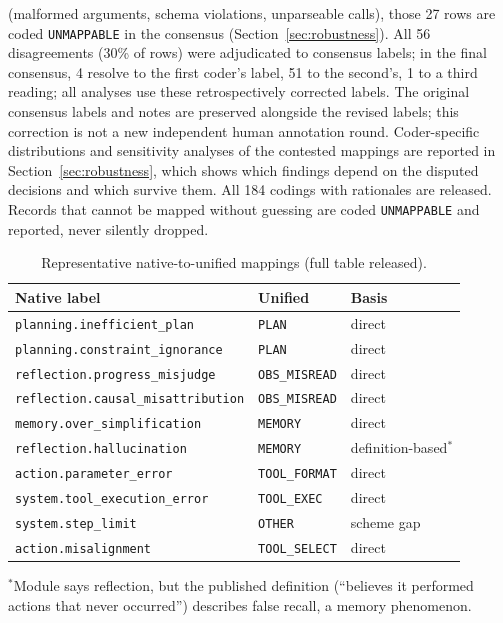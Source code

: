\documentclass[12pt,letterpaper]{article}
\begin{document}
(malformed arguments, schema violations, unparseable calls), those 27 rows
are coded \texttt{UNMAPPABLE} in the consensus (Section~\ref{sec:robustness}).
All 56 disagreements (30\% of rows) were adjudicated to consensus labels; in the final consensus, 4 resolve to the first
coder's label, 51 to the second's, 1 to a third reading; all analyses use these retrospectively corrected labels. The original
consensus labels and notes are preserved alongside the revised labels;
this correction is not a new independent human annotation round. Coder-specific distributions and sensitivity analyses of
the contested mappings are reported in Section~\ref{sec:robustness}, which shows which
findings depend on the disputed decisions and which survive them.
All 184 codings with rationales are
released. Records that cannot be mapped without guessing are coded
\texttt{UNMAPPABLE} and reported, never silently dropped.

\begin{table}[t]
\centering
\caption{Representative native-to-unified mappings (full table released).}
\label{tab:mapping}
\begin{tabular}{@{}lll@{}}
\toprule
Native label & Unified & Basis \\
\midrule
\texttt{planning.inefficient\_plan} & \texttt{PLAN} & direct \\
\texttt{planning.constraint\_ignorance} & \texttt{PLAN} & direct \\
\texttt{reflection.progress\_misjudge} & \texttt{OBS\_MISREAD} & direct \\
\texttt{reflection.causal\_misattribution} & \texttt{OBS\_MISREAD} & direct \\
\texttt{memory.over\_simplification} & \texttt{MEMORY} & direct \\
\texttt{reflection.hallucination} & \texttt{MEMORY} & definition-based$^*$ \\
\texttt{action.parameter\_error} & \texttt{TOOL\_FORMAT} & direct \\
\texttt{system.tool\_execution\_error} & \texttt{TOOL\_EXEC} & direct \\
\texttt{system.step\_limit} & \texttt{OTHER} & scheme gap \\
\texttt{action.misalignment} & \texttt{TOOL\_SELECT} & direct \\
\bottomrule
\end{tabular}
\begin{flushleft}\footnotesize{$^*$Module says reflection, but the published
definition (``believes it performed actions that never occurred'') describes
false recall, a memory phenomenon.}\end{flushleft}
\end{table}
\end{document}
